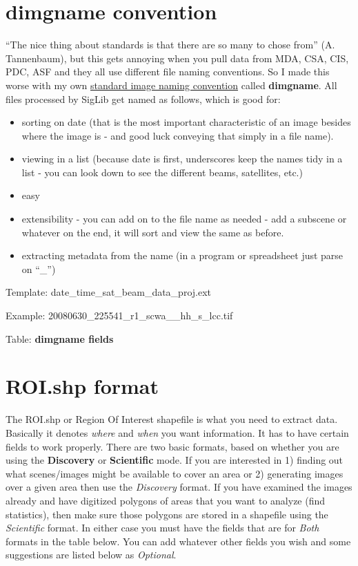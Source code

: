 \documentclass[letterpaper,10pt,english]{sphinxmanual}
\begin{document}
\section{dimgname convention}
\label{project:dimgname-convention}
“The nice thing about standards is that there are so many to chose from”
(A. Tannenbaum), but this gets annoying when you pull data from MDA,
CSA, CIS, PDC, ASF and they all use different file naming conventions.
So I made this worse with my own \href{https://xkcd.com/927/}{standard image naming
convention} called \textbf{dimgname}. All files
processed by SigLib get named as follows, which is good for:
\begin{itemize}
\item {} 
sorting on date (that is the most important characteristic of an
image besides where the image is - and good luck conveying that
simply in a file name).

\item {} 
viewing in a list (because date is first, underscores keep the names
tidy in a list - you can look down to see the different beams,
satellites, etc.)

\item {} 
easy

\item {} 
extensibility - you can add on to the file name as needed - add a
subscene or whatever on the end, it will sort and view the same as
before.

\item {} 
extracting metadata from the name (in a program or spreadsheet just
parse on ``\_'')

\end{itemize}

Template: date\_time\_sat\_beam\_data\_proj.ext

Example: 20080630\_225541\_r1\_scwa\_\_hh\_s\_lcc.tif

Table: \textbf{dimgname fields}


\section{ROI.shp format}
\label{project:roi-shp-format}
The ROI.shp or Region Of Interest shapefile is what you need to extract
data. Basically it denotes \emph{where} and \emph{when} you want information. It
has to have certain fields to work properly. There are two basic
formats, based on whether you are using the \textbf{Discovery} or
\textbf{Scientific} mode. If you are interested in 1) finding out what
scenes/images might be available to cover an area or 2) generating
images over a given area then use the \emph{Discovery} format. If you have
examined the images already and have digitized polygons of areas that
you want to analyze (find statistics), then make sure those polygons are
stored in a shapefile using the \emph{Scientific} format. In either case you
must have the fields that are for \emph{Both} formats in the table below. You
can add whatever other fields you wish and some suggestions are listed
below as \emph{Optional}.
\end{document}
